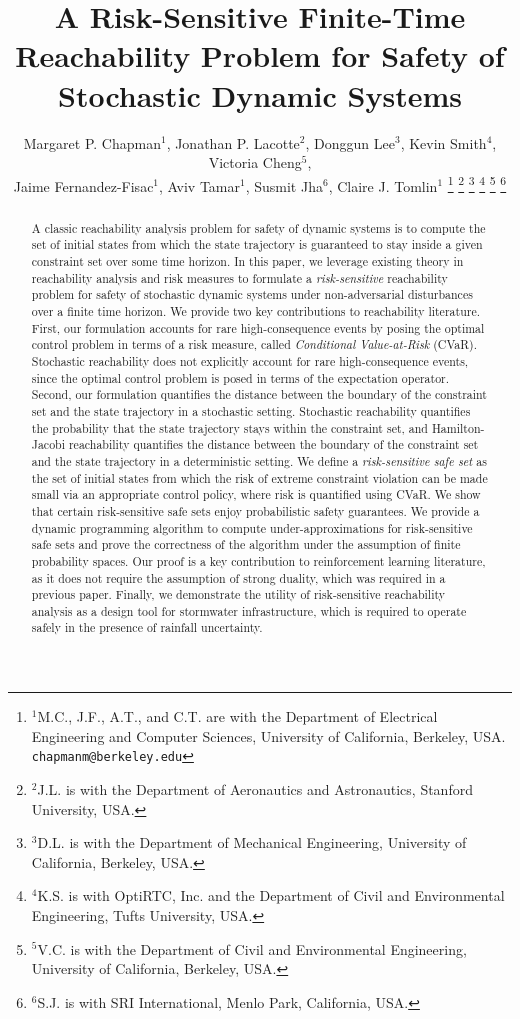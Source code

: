 \documentclass[letterpaper, 10 pt, conference]{ieeeconf}  %
\title{\LARGE \bf
A Risk-Sensitive Finite-Time Reachability Problem for Safety of Stochastic Dynamic Systems}
\author{Margaret P. Chapman$^{1}$, Jonathan P. Lacotte$^{2}$, Donggun Lee$^{3}$, Kevin Smith$^{4}$, Victoria Cheng$^{5}$,\\ 
Jaime Fernandez-Fisac$^{1}$, Aviv Tamar$^{1}$, Susmit Jha$^{6}$, Claire J. Tomlin$^{1}$%
\thanks{$^{1}$M.C., J.F., A.T., and C.T. are with the Department of Electrical Engineering and Computer Sciences, University of California, Berkeley, USA.
        {\tt\small chapmanm@berkeley.edu}}%
\thanks{$^{2}$J.L. is with the Department of Aeronautics and Astronautics, Stanford University, USA.
        }%
\thanks{$^{3}$D.L. is with the Department of Mechanical Engineering, University of California, Berkeley, USA.
        }%
\thanks{$^{4}$K.S. is with OptiRTC, Inc. and the Department of Civil and Environmental Engineering, Tufts University, USA.
        }%
\thanks{$^{5}$V.C. is with the Department of Civil and Environmental Engineering, University of California, Berkeley, USA.
        }%
\thanks{$^{6}$S.J. is with SRI International, Menlo Park, California, USA.
		}%
}
\begin{document}
\maketitle
\thispagestyle{empty}
\pagestyle{empty}

\begin{abstract}
A classic reachability analysis problem for safety of dynamic systems is to compute the set of initial states from which 
the state trajectory is guaranteed to stay inside a given constraint set over some time horizon. 
In this paper, we leverage existing theory in reachability analysis and risk measures 
to formulate a \textit{risk-sensitive} reachability problem for safety of stochastic dynamic systems under non-adversarial disturbances
over a finite time horizon.
We provide two key contributions to reachability literature. 
First, our formulation accounts for rare high-consequence events by posing the optimal control problem in terms of a risk measure, 
called \textit{Conditional Value-at-Risk} (CVaR).
Stochastic reachability does not explicitly account for rare high-consequence events,
since the optimal control problem is posed in terms of the expectation operator.
Second, our formulation quantifies the distance between the boundary of the constraint set and the state trajectory in a stochastic setting. 
Stochastic reachability quantifies the probability that the state trajectory stays within the constraint set,
and Hamilton-Jacobi reachability quantifies the distance between the boundary of the constraint set and the state trajectory
in a deterministic setting.
We define a \textit{risk-sensitive safe set} as the set of initial states from which the risk of extreme constraint violation
can be made small via an appropriate control policy, where risk is quantified using CVaR.
We show that certain risk-sensitive safe sets enjoy probabilistic safety guarantees.
We provide a dynamic programming algorithm to compute under-approximations for risk-sensitive safe sets
and prove the correctness of the algorithm under the assumption of finite probability spaces. 
Our proof is a key contribution to reinforcement learning literature, as it does not require the assumption of strong duality,
which was required in a previous paper.
Finally, we demonstrate the utility of risk-sensitive reachability analysis as a design tool for stormwater infrastructure,
which is required to operate safely in the presence of rainfall uncertainty.
\end{abstract}
\end{document}
